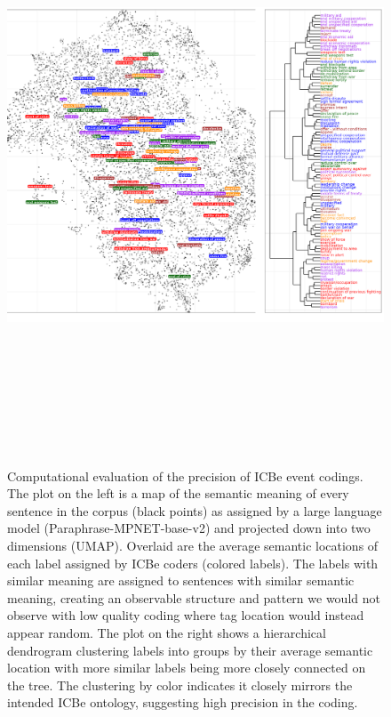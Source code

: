 \documentclass{article}
\begin{document}
\begin{figure}
\hypertarget{fig-umap}{%
\centering
\includegraphics[width=7in,height=7in]{p_semantic_embeddings_dendro.png}
\caption{Computational evaluation of the precision of ICBe event
codings. The plot on the left is a map of the semantic meaning of every
sentence in the corpus (black points) as assigned by a large language
model (Paraphrase-MPNET-base-v2) and projected down into two dimensions
(UMAP). Overlaid are the average semantic locations of each label
assigned by ICBe coders (colored labels). The labels with similar
meaning are assigned to sentences with similar semantic meaning,
creating an observable structure and pattern we would not observe with
low quality coding where tag location would instead appear random. The
plot on the right shows a hierarchical dendrogram clustering labels into
groups by their average semantic location with more similar labels being
more closely connected on the tree. The clustering by color indicates it
closely mirrors the intended ICBe ontology, suggesting high precision in
the coding.}\label{fig-umap}
}
\end{figure}
\end{document}
